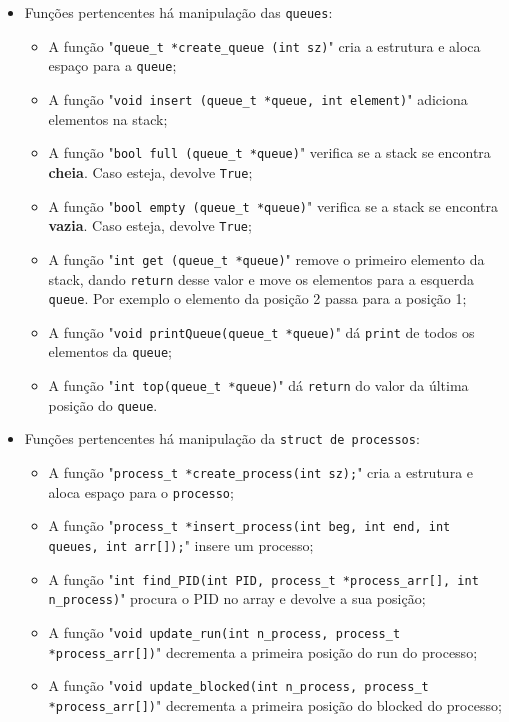 \documentclass[11pt]{article}   %
\begin{document}
\begin{itemize}
    \item Funções pertencentes há manipulação das \verb|queues|:
        \begin{itemize}
            \item A função "\verb|queue_t *create_queue (int sz)|" cria a estrutura e aloca espaço para a \verb|queue|;
            \item A função "\verb|void insert (queue_t *queue, int element)|" adiciona elementos na stack;
            \item A função "\verb|bool full (queue_t *queue)|" verifica se a stack se encontra \textbf{cheia}. Caso esteja, devolve \verb|True|;
            \item A função "\verb|bool empty (queue_t *queue)|" verifica se a stack se encontra \textbf{vazia}. Caso esteja, devolve \verb|True|;
            \item A função "\verb|int get (queue_t *queue)|" remove o primeiro elemento da stack, dando \verb|return| desse valor e move os elementos para a esquerda \verb|queue|. Por exemplo o elemento da posição 2 passa para a posição 1;
            \item A função "\verb|void printQueue(queue_t *queue)|" dá \verb|print| de todos os elementos da \verb|queue|;
            \item A função "\verb|int top(queue_t *queue)|" dá \verb|return| do valor da última posição do \verb|queue|.
        \end{itemize}
    \item Funções pertencentes há manipulação da \verb|struct de processos|:
        \begin{itemize}
            \item A função "\verb|process_t *create_process(int sz);|" cria a estrutura e aloca espaço para o \verb|processo|;
            \item A função "\verb|process_t *insert_process(int beg, int end, int queues, int arr[]);|" \newline insere um processo;
            \item A função "\verb|int find_PID(int PID, process_t *process_arr[], int n_process)|" procura o PID no array e devolve a sua posição;
            \item A função "\verb|void update_run(int n_process, process_t *process_arr[])|" decrementa a primeira posição do run do processo;
            \item A função "\verb|void update_blocked(int n_process, process_t *process_arr[])|" decrementa a primeira posição do blocked do processo;

\end{itemize}
\end{itemize}
\end{document}
